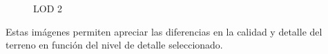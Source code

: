 \begin{itemize}
\begin{figure}[h]
\begin{minipage}{0.3\textwidth}
            \caption{LOD 2}
        \end{minipage}
    \end{figure}
\end{itemize}

Estas imágenes permiten apreciar las diferencias en la calidad y detalle del terreno en función del nivel de detalle seleccionado.

